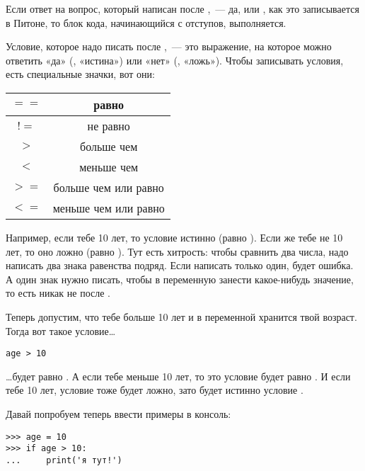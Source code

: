 Если ответ на вопрос, который написан после , — да, или , как это записывается в Питоне, то блок кода, начинающийся с отступов, выполняется.

Условие, которое надо писать после , — это выражение, на которое можно ответить «да» (, «истина») или «нет» (, «ложь»). Чтобы записывать условия, есть специальные значки, вот они:

\begin{center}
\begin{tabular}{|c|c|}
\hline
$==$ & равно \\
\hline
$!=$ & не равно \\
\hline
$>$ & больше чем \\
\hline
$<$ & меньше чем \\
\hline
$>=$ & больше чем или равно \\
\hline
$<=$ & меньше чем или равно \\
\hline
\end{tabular}
\end{center}

Например, если тебе 10 лет, то условие  истинно (равно ). Если же тебе не 10 лет, то оно ложно (равно ). Тут есть хитрость: чтобы сравнить два числа, надо написать два знака равенства подряд. Если написать только один, будет ошибка. А один знак нужно писать, чтобы в переменную занести какое-нибудь значение, то есть никак не после .

Теперь допустим, что тебе больше 10 лет и в переменной  хранится твой возраст. Тогда вот такое условие…

\begin{listing}
\begin{verbatim}
age > 10
\end{verbatim}
\end{listing}

…будет равно . А если тебе меньше 10 лет, то это условие будет равно . И если тебе 10 лет, условие тоже будет ложно, зато будет истинно условие .

Давай попробуем теперь ввести примеры в консоль:

\begin{listing}
\begin{verbatim}
>>> age = 10
>>> if age > 10:
...     print('я тут!')
\end{verbatim}
\end{listing}

